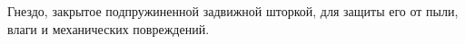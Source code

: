 Гнездо, закрытое подпружиненной задвижной шторкой, для защиты 
его от пыли, влаги и механических повреждений.